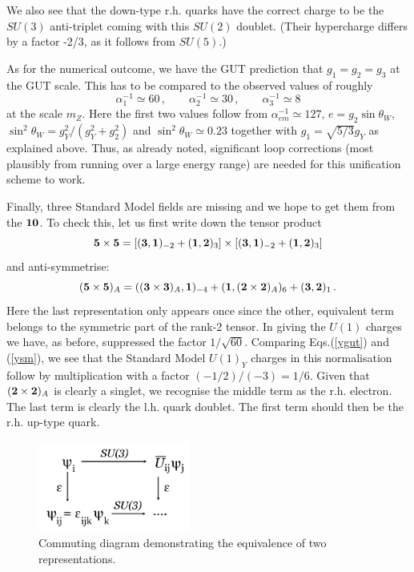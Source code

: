 \documentclass[12pt]{article}
\newcommand{\be}{\begin{equation}}
\newcommand{\ee}{\end{equation}}
\numberwithin{equation}{section}
\begin{document}
We also see that the down-type r.h. quarks have the correct charge to be the $SU(3)$ anti-triplet coming with this $SU(2)$ doublet. (Their hypercharge differs by a factor -2/3, as it follows from $SU(5)$.)

As for the numerical outcome, we have the GUT prediction that $g_1=g_2=g_3$ at the GUT scale. This has to be compared to the observed values of roughly
\be
\alpha_1^{-1}\simeq 60\,,\qquad \alpha_2^{-1}\simeq 30\,,\qquad \alpha_3^{-1}\simeq 8
\ee
at the scale $m_Z$. Here the first two values follow from $\alpha_{em}^{-1}\simeq 127$, $e=g_2\sin\theta_W$, $\sin^2\theta_W=g_Y^2/(g_Y^2+g_2^2)$ and $\sin^2\theta_W\simeq 0.23$ together with $g_1=\sqrt{5/3}g_Y$ as explained above. Thus, as already noted, significant loop corrections (most plausibly from running over a large energy range) are needed for this unification scheme to work. 

Finally, three Standard Model fields are missing and we hope to get them from the ${\bf 10}$. To check this, let us first write down the tensor product 
\be
{\bf 5}\times {\bf 5}=[({\bf 3},{\bf 1})_{-2}+({\bf 1},{\bf 2})_3]\times [({\bf 3},{\bf 1})_{-2}+({\bf 1},{\bf 2})_3]
\ee
and anti-symmetrise:
\be
({\bf 5}\times {\bf 5})_A=(({\bf 3}\times {\bf 3})_A,{\bf 1})_{-4}+({\bf 1},({\bf 2}\times {\bf 2})_A)_6+({\bf 3},{\bf 2})_1\,.
\ee
Here the last representation only appears once since the other, equivalent term belongs to the symmetric part of the rank-2 tensor. In giving the $U(1)$ charges we have, as before, suppressed the factor $1/\sqrt{60}$. Comparing Eqs.(\ref{ygut}) and (\ref{ysm}), we see that the Standard Model $U(1)_Y$ charges in this normalisation follow by multiplication with a factor $(-1/2)/(-3)=1/6$. Given that $({\bf 2}\times {\bf 2})_A$ is clearly a singlet, we recognise the middle term as the r.h. electron. The last term is clearly the l.h. quark doublet. The first term should then be the r.h. up-type quark. 

\begin{figure}[ht]
\begin{center} 
\includegraphics[width=5cm]{cd.png}
\caption{Commuting diagram demonstrating the equivalence of two representations.}
\label{cd} 
\end{center}
\end{figure}
\end{document}

